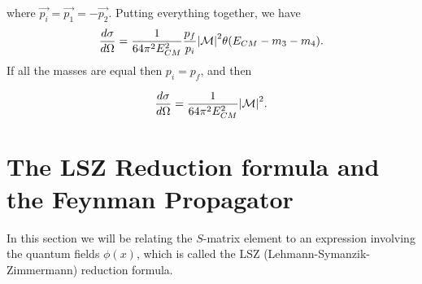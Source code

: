 \documentclass[11pt]{article}
\theoremstyle{definition}
\begin{document}
where $\vec{p_i} = \vec{p_1} = -\vec{p_2}$.
Putting everything together, we have
\begin{equation}
    \frac{d\sigma}{d\Omega} = \frac{1}{64\pi^2E_{CM}^2}\frac{p_f}{p_i}\abs{\mathcal{M}}^2\theta(E_{CM}-m_3-m_4).
\end{equation}
If all the masses are equal then $p_i = p_f$, and then
\begin{shaded}
    \begin{equation}
        \frac{d\sigma}{d\Omega} = \frac{1}{64\pi^2E_{CM}^2}\abs{\mathcal{M}}^2.
        \label{Eq. 22 scattering}
    \end{equation}
\end{shaded}



\section{The LSZ Reduction formula and the Feynman Propagator}
In this section we will be relating the $S$-matrix element to an expression involving the quantum fields $\phi(x)$, which is called the LSZ (Lehmann-Symanzik-Zimmermann) reduction formula.
\end{document}
